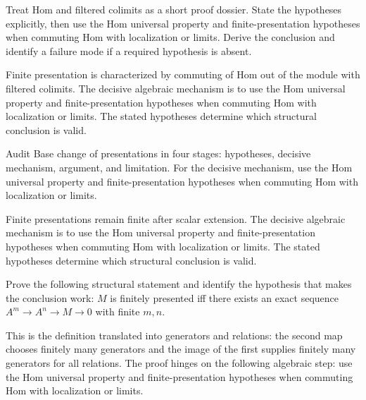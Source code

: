 \begin{problem}\label{prob:v12-problem-07}
Treat Hom and filtered colimits as a short proof dossier. State the hypotheses explicitly, then use the Hom universal property and finite-presentation hypotheses when commuting Hom with localization or limits. Derive the conclusion and identify a failure mode if a required hypothesis is absent.
\end{problem}
\begin{solution}
Finite presentation is characterized by commuting of Hom out of the module with filtered colimits. The decisive algebraic mechanism is to use the Hom universal property and finite-presentation hypotheses when commuting Hom with localization or limits. The stated hypotheses determine which structural conclusion is valid.
\end{solution}

\begin{problem}\label{prob:v12-problem-08}
Audit Base change of presentations in four stages: hypotheses, decisive mechanism, argument, and limitation. For the decisive mechanism, use the Hom universal property and finite-presentation hypotheses when commuting Hom with localization or limits.
\end{problem}
\begin{solution}
Finite presentations remain finite after scalar extension. The decisive algebraic mechanism is to use the Hom universal property and finite-presentation hypotheses when commuting Hom with localization or limits. The stated hypotheses determine which structural conclusion is valid.
\end{solution}

\begin{problem}\label{prob:v12-problem-09}
Prove the following structural statement and identify the hypothesis that makes the conclusion work: $M$ is finitely presented iff there exists an exact sequence $A^m\to A^n\to M\to0$ with finite $m,n$.
\end{problem}
\begin{solution}
This is the definition translated into generators and relations: the second map chooses finitely many generators and the image of the first supplies finitely many generators for all relations. The proof hinges on the following algebraic step: use the Hom universal property and finite-presentation hypotheses when commuting Hom with localization or limits.
\end{solution}

